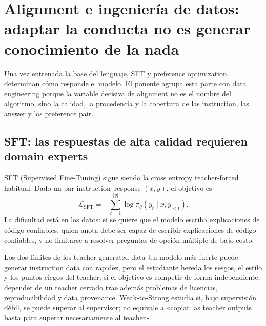 \section{Alignment e ingeniería de datos: adaptar la conducta no es generar conocimiento de la nada}

Una vez entrenada la base del lenguaje, SFT y preference optimization determinan cómo responde el modelo. El ponente agrupa esta parte con data engineering porque la variable decisiva de alignment no es el nombre del algoritmo, sino la calidad, la procedencia y la cobertura de las instruction, las answer y los preference pair.

\subsection{SFT: las respuestas de alta calidad requieren domain experts}

SFT (Supervised Fine-Tuning) sigue siendo la cross entropy teacher-forced habitual. Dado un par instruction--response $(x,y)$, el objetivo es
\[
\mathcal{L}_{\text{SFT}}=-\sum_{t=1}^{|y|}\log \pi_\theta(y_t\mid x,y_{<t}).
\]
La dificultad está en los datos: si se quiere que el modelo escriba explicaciones de código confiables, quien anota debe ser capaz de escribir explicaciones de código confiables, y no limitarse a resolver preguntas de opción múltiple de bajo costo.


\begin{knowledgebox}{Los dos límites de los teacher-generated data}
Un modelo más fuerte puede generar instruction data con rapidez, pero el estudiante hereda los sesgos, el estilo y los puntos ciegos del teacher; si el objetivo es competir de forma independiente, depender de un teacher cerrado trae además problemas de licencias, reproducibilidad y data provenance. Weak-to-Strong estudia si, bajo supervisión débil, se puede superar al supervisor; no equivale a «copiar las teacher outputs basta para superar necesariamente al teacher».
\end{knowledgebox}


